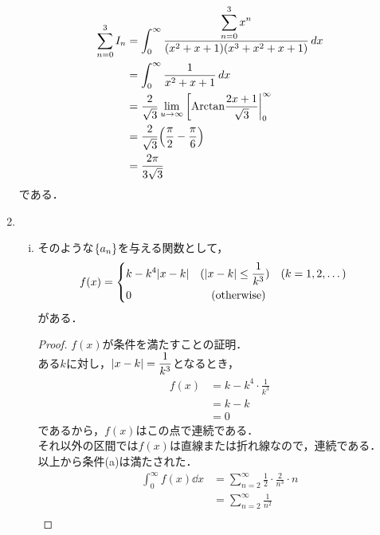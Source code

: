 \begin{enumerate}[(1)]
    \begin{align}
        \sum_{n=0}^3 I_n
        &=\int_0^\infty \frac{\displaystyle \sum_{n=0}^3 x^n}{(x^2+x+1)(x^3+x^2+x+1)}\dd{x}\\
        &=\int_0^\infty \frac{1}{x^2+x+1}\dd{x}\\
        &=\frac{2}{\sqrt{3}} \lim_{u\to\infty} \eval[\mathrm{Arctan}{\frac{2x+1}{\sqrt{3}}}|_0^\infty\\
        &=\frac{2}{\sqrt{3}} \qty(\frac{\pi }{2}-\frac{\pi}{6}) \\
        &=\frac{2\pi}{3\sqrt{3}}
    \end{align}
    である．
    \item 
    \begin{enumerate}[(i)]
        \item 
        \begin{proposition}
            そのような$\qty{a_n}$を与える関数として，
            \begin{equation}
                f(x)=
                \begin{dcases}
                    k-k^4\abs{x-k}&(\abs{x-k}\le \dfrac{1}{k^3}) \qq{($k = 1,2,\dots$)} \\
                    0&\qq{(otherwise)}
                \end{dcases}
            \end{equation}
            がある．
        \end{proposition}
        \begin{proof}
            $f(x)$が条件を満たすことの証明．\\
            ある$k$に対し，$\abs{x-k}=\dfrac{1}{k^3}$となるとき，
            \begin{align}
                f(x)
                &=k-k^4\cdot\frac{1}{k^3}\\
                &=k-k\\
                &=0
            \end{align}
            であるから，$f(x)$はこの点で連続である．\\
            それ以外の区間では$f(x)$は直線または折れ線なので，連続である．\\
            以上から条件(a)は満たされた．
            \begin{align}
                \int_0^\infty f(x)\dd{x}
                &=\sum_{n=2}^\infty \frac{1}{2}\cdot\frac{2}{n^3}\cdot n\\
                &=\sum_{n=2}^\infty \frac{1}{n^2}\\

\end{align}
\end{proof}
\end{enumerate}
\end{enumerate}
